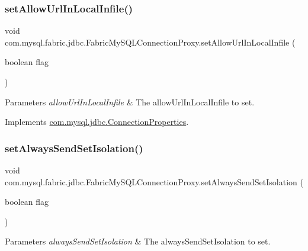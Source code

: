 \subsubsection{\texorpdfstring{set\+Allow\+Url\+In\+Local\+Infile()}{setAllowUrlInLocalInfile()}}
{\footnotesize\ttfamily void com.\+mysql.\+fabric.\+jdbc.\+Fabric\+My\+S\+Q\+L\+Connection\+Proxy.\+set\+Allow\+Url\+In\+Local\+Infile (\begin{DoxyParamCaption}\item[{boolean}]{flag }\end{DoxyParamCaption})}


\begin{DoxyParams}{Parameters}
{\em allow\+Url\+In\+Local\+Infile} & The allow\+Url\+In\+Local\+Infile to set. \\
\hline
\end{DoxyParams}


Implements \mbox{\hyperlink{interfacecom_1_1mysql_1_1jdbc_1_1_connection_properties_ad7e99f72c64f4572e9952747489da7b4}{com.\+mysql.\+jdbc.\+Connection\+Properties}}.

\mbox{\label{classcom_1_1mysql_1_1fabric_1_1jdbc_1_1_fabric_my_s_q_l_connection_proxy_a9bd6f9eab9168c6a2c5914223f6e6b95}} 
\subsubsection{\texorpdfstring{set\+Always\+Send\+Set\+Isolation()}{setAlwaysSendSetIsolation()}}
{\footnotesize\ttfamily void com.\+mysql.\+fabric.\+jdbc.\+Fabric\+My\+S\+Q\+L\+Connection\+Proxy.\+set\+Always\+Send\+Set\+Isolation (\begin{DoxyParamCaption}\item[{boolean}]{flag }\end{DoxyParamCaption})}


\begin{DoxyParams}{Parameters}
{\em always\+Send\+Set\+Isolation} & The always\+Send\+Set\+Isolation to set. \\
\hline
\end{DoxyParams}


